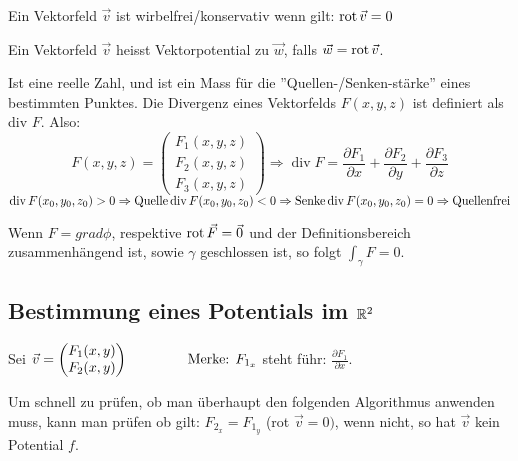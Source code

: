 \begin{definition}
Ein Vektorfeld $\vec{v}$ ist wirbelfrei/konservativ wenn gilt: $\operatorname{rot} \vec{v} = 0$
\end{definition}

\begin{definition}[Vektorpotential]
Ein Vektorfeld $\vec{v}$ heisst Vektorpotential zu $\vec{w}$, falls $\vec{w} = \operatorname{rot} \vec{v}$.
\end{definition}

\begin{definition}[Divergenz]
Ist eine reelle Zahl, und ist ein Mass für die ''Quellen-/Senken-stärke'' eines bestimmten Punktes. 
Die Divergenz eines Vektorfelds $F(x, y, z)$ ist definiert als div $F$. Also:
\[
F(x, y, z) = 
\left(
	\begin{array}{c}
		F_1 (x, y, z) \\
		F_2 (x, y, z) \\
		F_3 (x, y, z)
	\end{array}
\right) \Rightarrow
	\operatorname{div} F = \frac{\partial F_1}{\partial x} + \frac{\partial F_2}{\partial y} + 
	\frac{\partial F_3}{\partial z}
\] 
$
\operatorname{div} F(x_0, y_0, z_0) > 0 \Rightarrow \text{Quelle}\\
\operatorname{div} F(x_0, y_0, z_0) < 0 \Rightarrow \text{Senke}\\
\operatorname{div} F(x_0, y_0, z_0) = 0 \Rightarrow \text{Quellenfrei}
$
\end{definition}

\begin{lemma}
Wenn $F = grad \phi$, respektive $\operatorname{rot} \vec{F} =\vec{0}$ und der Definitionsbereich zusammenhängend ist,
sowie $\gamma$ geschlossen ist, so folgt $\int_\gamma F = 0$.
\end{lemma}

\pagebreak
\subsection{Bestimmung eines Potentials im $\mathbb{R}^2$}
Sei $\vec{v} = \begin{pmatrix}
F_1(x,y)\\
F_2(x,y)
\end{pmatrix} \hspace{1.5cm} \text{Merke: } F_{1_x}$ steht führ: $\frac{\partial F_1}{\partial x}$.

Um schnell zu prüfen, ob man überhaupt den folgenden Algorithmus anwenden muss,
kann man prüfen ob gilt: $F_{2_x} = F_{1_y}$ (rot $\vec{v} = 0)$, wenn nicht, so hat $\vec{v}$ kein Potential $f$.

